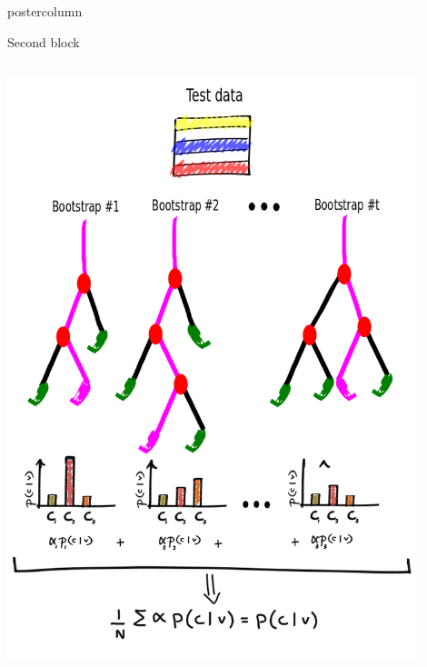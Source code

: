 \documentclass[final]{beamer}
\begin{document}
\begin{frame}
\begin{columns}
\begin{column}{.49\textwidth}
\begin{beamercolorbox}[center,wd=\textwidth]{postercolumn}
\begin{minipage}[T]{.95\textwidth}
{\begin{block}{Second block}
\begin{itemize}
\begin{columns}
\begin{column}{.44\textwidth}
            			\includegraphics[width = 0.9\textwidth, height = 0.15\textheight]{images/framework/RF_test.png}
            		\end{column}
            \end{columns}
            \end{itemize}
            \end{block}          
            \vfill
         
}
\end{minipage}
\end{beamercolorbox}
\end{column}
\end{columns}
\end{frame}
\end{document}
